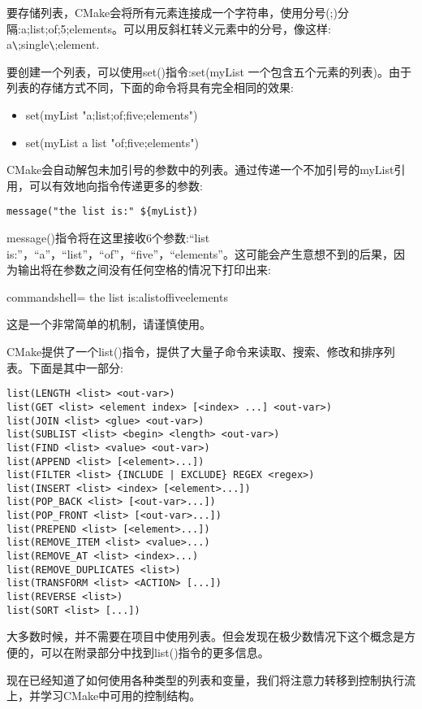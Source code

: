要存储列表，CMake会将所有元素连接成一个字符串，使用分号(;)分隔:a;list;of;5;elements。可以用反斜杠转义元素中的分号，像这样: a\verb|\|;single\verb|\|;element.

要创建一个列表，可以使用set()指令:set(myList 一个包含五个元素的列表)。由于列表的存储方式不同，下面的命令将具有完全相同的效果:

\begin{itemize}
\item 
set(myList "a;list;of;five;elements")

\item 
set(myList a list "of;five;elements")
\end{itemize}

CMake会自动解包未加引号的参数中的列表。通过传递一个不加引号的myList引用，可以有效地向指令传递更多的参数:

\begin{lstlisting}[style=styleCMake]
message("the list is:" ${myList})
\end{lstlisting}

message()指令将在这里接收6个参数:“list is:”，“a”，“list”，“of”，“five”，“elements”。这可能会产生意想不到的后果，因为输出将在参数之间没有任何空格的情况下打印出来:

\begin{tcblisting}{commandshell={}}
the list is:alistoffiveelements
\end{tcblisting}

这是一个非常简单的机制，请谨慎使用。

CMake提供了一个list()指令，提供了大量子命令来读取、搜索、修改和排序列表。下面是其中一部分:

\begin{lstlisting}[style=styleCMake]
list(LENGTH <list> <out-var>)
list(GET <list> <element index> [<index> ...] <out-var>)
list(JOIN <list> <glue> <out-var>)
list(SUBLIST <list> <begin> <length> <out-var>)
list(FIND <list> <value> <out-var>)
list(APPEND <list> [<element>...])
list(FILTER <list> {INCLUDE | EXCLUDE} REGEX <regex>)
list(INSERT <list> <index> [<element>...])
list(POP_BACK <list> [<out-var>...])
list(POP_FRONT <list> [<out-var>...])
list(PREPEND <list> [<element>...])
list(REMOVE_ITEM <list> <value>...)
list(REMOVE_AT <list> <index>...)
list(REMOVE_DUPLICATES <list>)
list(TRANSFORM <list> <ACTION> [...])
list(REVERSE <list>)
list(SORT <list> [...])
\end{lstlisting}

大多数时候，并不需要在项目中使用列表。但会发现在极少数情况下这个概念是方便的，可以在附录部分中找到list()指令的更多信息。

现在已经知道了如何使用各种类型的列表和变量，我们将注意力转移到控制执行流上，并学习CMake中可用的控制结构。



















